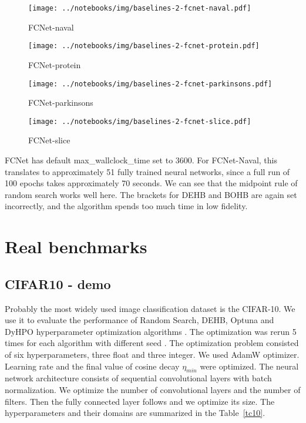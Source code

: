 \begin{figure}[H]
    \centering
    \texttt{[image: ../notebooks/img/baselines-2-fcnet-naval.pdf]}
    \caption{FCNet-naval}
\end{figure}

\begin{figure}[H]
    \centering
    \texttt{[image: ../notebooks/img/baselines-2-fcnet-protein.pdf]}
    \caption{FCNet-protein}
\end{figure}


\begin{figure}[H]
    \centering
    \texttt{[image: ../notebooks/img/baselines-2-fcnet-parkinsons.pdf]}
    \caption{FCNet-parkinsons}
\end{figure}

\begin{figure}[H]
    \centering
    \texttt{[image: ../notebooks/img/baselines-2-fcnet-slice.pdf]}
    \caption{FCNet-slice}
\end{figure}

FCNet has default max\_wallclock\_time set to 3600. For FCNet-Naval, this translates to approximately 51 fully trained neural networks, since a full run of 100 epochs takes approximately 70 seconds.  We can see that the midpoint rule of random search works well here. The brackets for DEHB and BOHB are again set incorrectly, and the algorithm spends too much time in low fidelity.

\section{Real benchmarks}
\subsection{CIFAR10 - demo}

Probably the most widely used image classification dataset is the CIFAR-10. We use it to evaluate the performance of Random Search, DEHB, Optuna and DyHPO hyperparameter optimization algorithms . The optimization was rerun 5 times for each algorithm with different seed . The optimization problem consisted of six hyperparameters, three float and three integer. We used AdamW optimizer. Learning rate and the final value of cosine decay $\eta_{min}$ were optimized. The neural network architecture consists of sequential convolutional layers with batch normalization. We optimize the number of convolutional layers and the number of filters. Then the fully connected layer follows and we optimize its size. The hyperparameters and their domains are summarized in the Table~\ref{tc10}.

